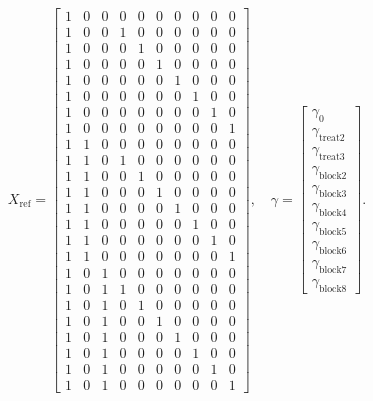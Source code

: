{\[X_{\mathrm{ref}}=\begin{bmatrix}1&0&0&0&0&0&0&0&0&0\\1&0&0&1&0&0&0&0&0&0\\1&0&0&0&1&0&0&0&0&0\\1&0&0&0&0&1&0&0&0&0\\1&0&0&0&0&0&1&0&0&0\\1&0&0&0&0&0&0&1&0&0\\1&0&0&0&0&0&0&0&1&0\\1&0&0&0&0&0&0&0&0&1\\1&1&0&0&0&0&0&0&0&0\\1&1&0&1&0&0&0&0&0&0\\1&1&0&0&1&0&0&0&0&0\\1&1&0&0&0&1&0&0&0&0\\1&1&0&0&0&0&1&0&0&0\\1&1&0&0&0&0&0&1&0&0\\1&1&0&0&0&0&0&0&1&0\\1&1&0&0&0&0&0&0&0&1\\1&0&1&0&0&0&0&0&0&0\\1&0&1&1&0&0&0&0&0&0\\1&0&1&0&1&0&0&0&0&0\\1&0&1&0&0&1&0&0&0&0\\1&0&1&0&0&0&1&0&0&0\\1&0&1&0&0&0&0&1&0&0\\1&0&1&0&0&0&0&0&1&0\\1&0&1&0&0&0&0&0&0&1\end{bmatrix},\quad\gamma=\begin{bmatrix}\gamma_0\\\gamma_{\mathrm{treat}2}\\\gamma_{\mathrm{treat}3}\\\gamma_{\mathrm{block}2}\\\gamma_{\mathrm{block}3}\\\gamma_{\mathrm{block}4}\\\gamma_{\mathrm{block}5}\\\gamma_{\mathrm{block}6}\\\gamma_{\mathrm{block}7}\\\gamma_{\mathrm{block}8}\end{bmatrix}.\]
}
